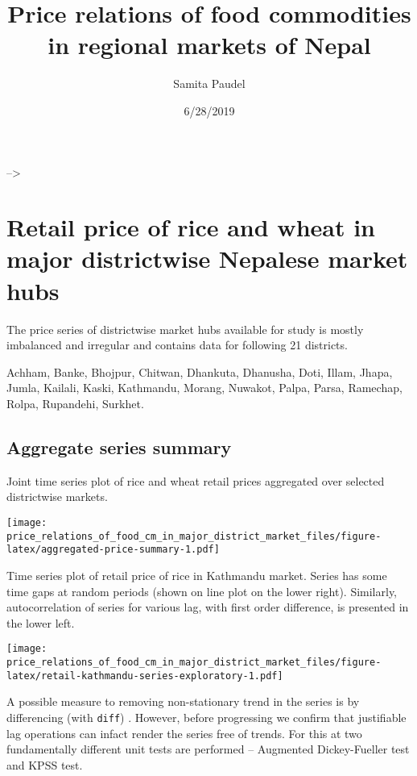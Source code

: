 \documentclass[
  12pt,
]{article}
\title{Price relations of food commodities in regional markets of Nepal}
\author{Samita Paudel}
\date{6/28/2019}
\begin{document}
\maketitle

--\textgreater{}

\hypertarget{retail-price-of-rice-and-wheat-in-major-districtwise-nepalese-market-hubs}{%
\section{Retail price of rice and wheat in major districtwise Nepalese market hubs}\label{retail-price-of-rice-and-wheat-in-major-districtwise-nepalese-market-hubs}}

The price series of districtwise market hubs available for study is mostly imbalanced and irregular and contains data for following 21 districts.

Achham, Banke, Bhojpur, Chitwan, Dhankuta, Dhanusha, Doti, Illam, Jhapa, Jumla, Kailali, Kaski, Kathmandu, Morang, Nuwakot, Palpa, Parsa, Ramechap, Rolpa, Rupandehi, Surkhet.

\hypertarget{aggregate-series-summary}{%
\subsection{Aggregate series summary}\label{aggregate-series-summary}}

Joint time series plot of rice and wheat retail prices aggregated over selected districtwise markets.

\texttt{[image: price\_relations\_of\_food\_cm\_in\_major\_district\_market\_files/figure-latex/aggregated-price-summary-1.pdf]}

Time series plot of retail price of rice in Kathmandu market. Series has some time gaps at random periods (shown on line plot on the lower right). Similarly, autocorrelation of series for various lag, with first order difference, is presented in the lower left.

\texttt{[image: price\_relations\_of\_food\_cm\_in\_major\_district\_market\_files/figure-latex/retail-kathmandu-series-exploratory-1.pdf]}

A possible measure to removing non-stationary trend in the series is by differencing (with \texttt{diff}) . However, before progressing we confirm that justifiable lag operations can infact render the series free of trends. For this at two fundamentally different unit tests are performed -- Augmented Dickey-Fueller test and KPSS test.
\end{document}
